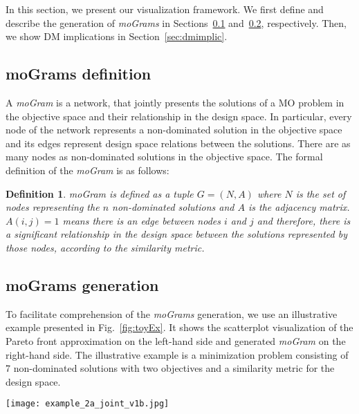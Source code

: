\documentclass[journal]{IEEEtran}
\newtheorem*{mydef}{Definition}
\begin{document}
In this section, we present our visualization framework. We first define and describe the generation of \emph{moGrams} in Sections~\ref{sec:mogramsDef} and~\ref{sec:mogramsGen}, respectively. Then, we show DM implications in Section~\ref{sec:dmimplic}.

\subsection{moGrams definition}
\label{sec:mogramsDef}

A \emph{moGram} is a network, that jointly presents the solutions of a MO problem in the objective space and their relationship in the design space. In particular, every node of the network represents a non-dominated solution in the objective space and its edges represent design space relations between the solutions. There are as many nodes as non-dominated solutions in the objective space. The formal definition of the \emph{moGram} is as follows:

\begin{mydef}
 moGram \emph{is defined as a tuple} $G=(N,A)$ \emph{where} $N$ \emph{is the set of nodes representing the $n$ non-dominated solutions and} $A$ \emph{is the adjacency matrix.} $A(i,j)=1$ \emph{means there is an edge between nodes $i$ and $j$ and therefore, there is a significant relationship in the design space between the solutions represented by those nodes, according to the similarity metric.}
\end{mydef}



\subsection{moGrams generation}
\label{sec:mogramsGen}






To facilitate comprehension of the \emph{moGrams} generation, we use an illustrative example presented in Fig.~\ref{fig:toyEx}. It shows the scatterplot visualization of the Pareto front approximation on the left-hand side and generated \emph{moGram} on the right-hand side. The illustrative example is a minimization problem consisting of 7 non-dominated solutions with two objectives and a similarity metric for the design space. 


\begin{figure*}[htb!]
\begin{center}
\texttt{[image: example\_2a\_joint\_v1b.jpg]}
\caption{A Pareto front approximation (on the left) and the corresponding \emph{moGram} (on the right) for a toy example.}
\label{fig:toyEx}
\end{center}
\end{figure*}
\end{document}
